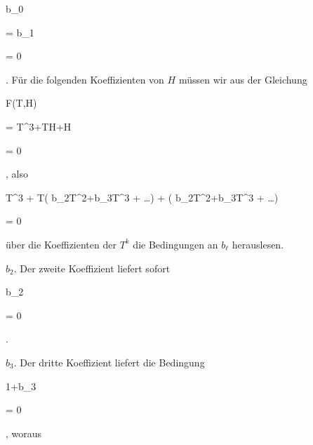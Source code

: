 {\mavergleichskette

{\vergleichskette

{b_0
}

{ = }{b_1
}

{ = }{ 0
}

{    }{
}

{   }{
}

}
{}{}{.}
Für die folgenden Koeffizienten von $H$ müssen wir aus der Gleichung


\mavergleichskettedisp

{\vergleichskette

{ F(T,H)
}

{ =} { T^3+TH+H
}

{ =} { 0
}

{ } {
}

{ } {
}

}
{}{}{,}
also


\mavergleichskettedisp

{\vergleichskette

{ T^3 + T( b_2T^2+b_3T^3 + \ldots ) + ( b_2T^2+b_3T^3 + \ldots )
}

{ =} { 0
}

{ } {
}

{ } {
}

{ } {
}

}
{}{}{}
über die Koeffizienten der $T^k$ die Bedingungen an $b_\ell$ herauslesen.


$b_2$. Der zweite Koeffizient
 {} {}
liefert sofort


\mavergleichskette

{\vergleichskette

{ b_2
}

{ = }{ 0
}

{  }{
}

{    }{
}

{   }{
}

}
{}{}{.}


$b_3$. Der dritte Koeffizient liefert die Bedingung


\mavergleichskette

{\vergleichskette

{ 1+b_3
}

{ = }{ 0
}

{  }{
}

{    }{
}

{   }{
}

}
{}{}{,}
woraus


\mavergleichskette

}
